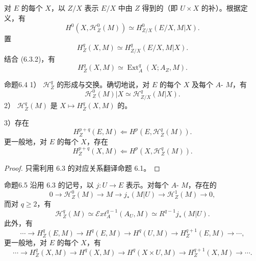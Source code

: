 对 $E$ 的每个 $X$，以 $Z/X$ 表示 $E/X$ 中由 $Z$ 得到的（即 $U\times X$ 的补）。根据定义，有
\begin{equation}H^0(X,\mathscr H_Z^0(M))\simeq H_{Z/X}^0(E/X,M|X).\tag{6.3.5}\end{equation}
置
\begin{equation}H_Z^q(X,M)\simeq H_{Z/X}^q(E/X,M|X).\tag{6.3.6}\end{equation}
结合 (6.3.2)，有
\begin{equation}H_Z^q(X,M)\simeq\operatorname{Ext}_A^q(X;A_Z,M).\tag{6.3.7}\end{equation}
\begin{SGAresult}{命题}{6.4}
1） $\mathscr H_Z^q$ 的形成与交换。确切地说，对 $E$ 的每个 $X$ 及每个 $A$- $M$，有
\begin{equation}\mathscr H_Z^0(M)|X\simeq\mathscr H_{Z/X}^q(M|X).\tag{6.4.1}\end{equation}
2） $\mathscr H_Z^q(M)$ 是 $X\mapsto H_Z^q(X,M)$ 的。

3）存在
\begin{equation}H_Z^{p+q}(E,M)\Longleftarrow H^p(E,\mathscr H_Z^q(M)).\tag{6.4.2}\end{equation}
更一般地，对 $E$ 的每个 $X$，存在
\begin{equation}H_Z^{p+q}(X,M)\Longleftarrow H^p(X,\mathscr H_Z^q(M)).\tag{6.4.3}\end{equation}
\end{SGAresult}
\begin{proof}只需利用 6.3 的对应关系翻译命题 6.1。\end{proof}
\begin{SGAresult}{命题}{6.5}
沿用 6.3 的记号，以 $j:U\to E$ 表示。对每个 $A$- $M$，存在的
\begin{equation}0\to\mathscr H_Z^0(M)\to M\to j_*(M|U)\to\mathscr H_Z^1(M)\to0,\tag{6.5.1}\end{equation}
而对 $q\geq2$，有
\begin{equation}\mathscr H_Z^q(M)\simeq\mathscr Ext_A^{q-1}(A_U,M)\simeq R^{q-1}j_*(M|U).\tag{6.5.2}\end{equation}
此外，有
\begin{equation}\cdots\to H_Z^q(E,M)\to H^q(E,M)\to H^q(U,M)\to H_Z^{q+1}(E,M)\to\cdots,\tag{6.5.3}\end{equation}
更一般地，对 $E$ 的每个 $X$，有
\begin{equation}\cdots\to H_Z^q(X,M)\to H^q(X,M)\to H^q(X\times U,M)\to H_Z^{q+1}(X,M)\to\cdots.\tag{6.5.4}\end{equation}
\end{SGAresult}
